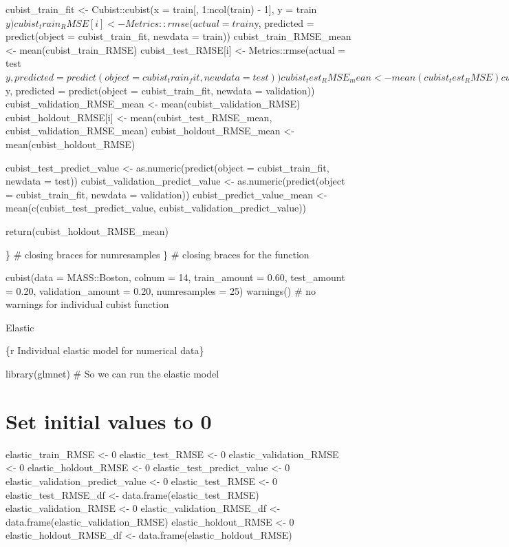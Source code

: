 \documentclass[
]{book}
\begin{document}
cubist\_train\_fit \textless- Cubist::cubist(x = train{[}, 1:ncol(train) - 1{]}, y =
train\(y)
cubist_train_RMSE[i] <- Metrics::rmse(actual = train\)y, predicted =
predict(object = cubist\_train\_fit, newdata = train))
cubist\_train\_RMSE\_mean \textless- mean(cubist\_train\_RMSE) cubist\_test\_RMSE{[}i{]}
\textless- Metrics::rmse(actual =
test\(y, predicted = predict(object = cubist_train_fit, newdata = test))
cubist_test_RMSE_mean <- mean(cubist_test_RMSE)
cubist_validation_RMSE[i] <- Metrics::rmse(actual = validation\)y,
predicted = predict(object = cubist\_train\_fit, newdata = validation))
cubist\_validation\_RMSE\_mean \textless- mean(cubist\_validation\_RMSE)
cubist\_holdout\_RMSE{[}i{]} \textless- mean(cubist\_test\_RMSE\_mean,
cubist\_validation\_RMSE\_mean) cubist\_holdout\_RMSE\_mean \textless-
mean(cubist\_holdout\_RMSE)

cubist\_test\_predict\_value \textless- as.numeric(predict(object =
cubist\_train\_fit, newdata = test)) cubist\_validation\_predict\_value \textless-
as.numeric(predict(object = cubist\_train\_fit, newdata = validation))
cubist\_predict\_value\_mean \textless- mean(c(cubist\_test\_predict\_value,
cubist\_validation\_predict\_value))

return(cubist\_holdout\_RMSE\_mean)

\} \# closing braces for numresamples \} \# closing braces for the
function

cubist(data = MASS::Boston, colnum = 14, train\_amount = 0.60,
test\_amount = 0.20, validation\_amount = 0.20, numresamples = 25)
warnings() \# no warnings for individual cubist function

Elastic

\{r Individual elastic model for numerical data\}

library(glmnet) \# So we can run the elastic model

\chapter{Set initial values to 0}\label{set-initial-values-to-0-4}

elastic\_train\_RMSE \textless- 0 elastic\_test\_RMSE \textless- 0 elastic\_validation\_RMSE
\textless- 0 elastic\_holdout\_RMSE \textless- 0 elastic\_test\_predict\_value \textless- 0
elastic\_validation\_predict\_value \textless- 0 elastic\_test\_RMSE \textless- 0
elastic\_test\_RMSE\_df \textless- data.frame(elastic\_test\_RMSE)
elastic\_validation\_RMSE \textless- 0 elastic\_validation\_RMSE\_df \textless-
data.frame(elastic\_validation\_RMSE) elastic\_holdout\_RMSE \textless- 0
elastic\_holdout\_RMSE\_df \textless- data.frame(elastic\_holdout\_RMSE)
\end{document}
